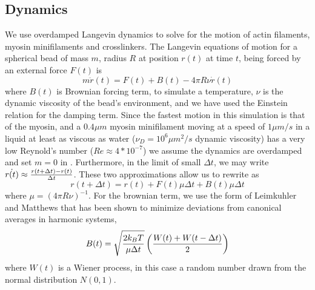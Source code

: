 \documentclass[12pt]{article}
\begin{document}
\subsection{Dynamics}
We use overdamped Langevin dynamics to solve for the motion of actin filaments, myosin minifilaments and crosslinkers.
The Langevin equations of motion for a spherical bead of
mass $m$, radius $R$ at position $r(t)$ at time $t$, being forced by an external force $F(t)$ is
\begin{equation}
  m\ddot{r}(t) = F(t) + B(t) - 4\pi R\nu \dot{r}(t)
  \label{eqn:lang}
\end{equation} 
where $B(t)$ is Brownian forcing term, to simulate a temperature, $\nu$ is the dynamic viscosity of the bead's
environment, and we have used the Einstein relation for the damping term.  
Since the fastest motion in this simulation is that of the myosin, and a $0.4\mu m$ myosin minifilament moving at
a speed of $1\mu m/s$ in a liquid at least as viscous as water ($\nu_D=10^6\mu m^2/s$ dynamic viscosity) has a very low Reynold's
number ($Re \approx 4*10^{-7}$) we assume the dynamics are overdamped and set $m=0$ in .
Furthermore, in the limit of small $\Delta t$, we may write $\dot{r(t)} \approx {r(t+\Delta t)-r(t)\over \Delta t}$. These two
approximations allow us to rewrite  as 
\begin{equation}  
  r(t+\Delta t) = r(t) + F(t)\mu \Delta t + B(t) \mu \Delta t
  \label{eqn:overdamped}
\end{equation}
where $\mu = (4\pi R\nu)^{-1}$. For the brownian term, we use the form of Leimkuhler and Matthews \cite{leimkuhler2013} that has
been shown to minimize deviations from canonical averages in harmonic systems,
\begin{equation}
  B(t)=\sqrt{2k_BT\over\mu \Delta t}\left({W(t)+W(t-\Delta t)\over2}\right)
  \label{eqn:baoab_brownian}
\end{equation} 
where $W(t)$ is a Wiener process, in this case a random number drawn from the normal distribution $N(0,1)$. 
\end{document}
